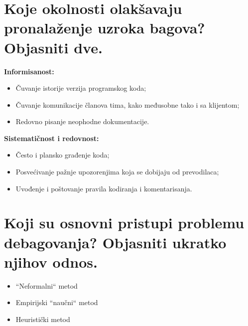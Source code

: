 \documentclass[a4paper]{article}
\begin{document}
\section{Koje okolnosti olakšavaju pronalaženje uzroka bagova? Objasniti dve.}
  \noindent \textbf{Informisanost:}
  \begin{itemize}
    \item Čuvanje istorije verzija programskog koda;
    \item Čuvanje komunikacije članova tima, kako međusobne tako i sa klijentom;
    \item Redovno pisanje neophodne dokumentacije.
  \end{itemize}
  \textbf{Sistematičnost i redovnost:}
  \begin{itemize}
    \item Često i plansko građenje koda;
    \item Posvećivanje pažnje upozorenjima koja se dobijaju od prevodilaca;
    \item Uvođenje i poštovanje pravila kodiranja i komentarisanja.
  \end{itemize}

\section{Koji su osnovni pristupi problemu debagovanja? Objasniti ukratko njihov odnos.}
  \begin{itemize}
    \item ``Neformalni`` metod
    \item Empirijski ``naučni`` metod
    \item Heuristički metod \\
  \end{itemize}

\newpage
\end{document}
